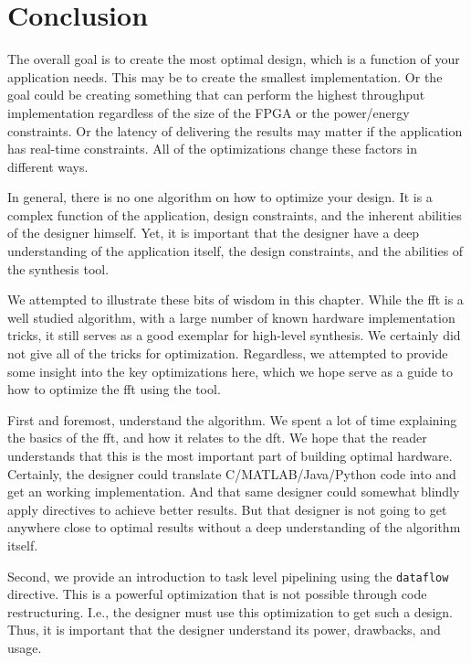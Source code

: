 \section{Conclusion}
\label{sec:fft_conclusion}

The overall goal is to create the most optimal design, which is a function of your application needs. This may be to create the smallest implementation. Or the goal could be creating something that can perform the highest throughput implementation regardless of the size of the FPGA or the power/energy constraints. Or the latency of delivering the results may matter if the application has real-time constraints. All of the optimizations change these factors in different ways. 

In general, there is no one algorithm on how to optimize your design. It is a complex function of the application, design constraints, and the inherent abilities of the designer himself. Yet, it is important that the designer have a deep understanding of the application itself, the design constraints, and the abilities of the synthesis tool. 

We attempted to illustrate these bits of wisdom in this chapter. While the \gls{fft} is a well studied algorithm, with a large number of known hardware implementation tricks, it still serves as a good exemplar for high-level synthesis. We certainly did not give all of the tricks for optimization. %
Regardless, we attempted to provide some insight into the key optimizations here, which we hope serve as a guide to how to optimize the \gls{fft} using the \VHLS tool.

First and foremost, understand the algorithm. We spent a lot of time explaining the basics of the \gls{fft}, and how it relates to the \gls{dft}. We hope that the reader understands that this is the most important part of building optimal hardware. Certainly, the designer could translate C/MATLAB/Java/Python code into \VHLS and get an working implementation. And that same designer could somewhat blindly apply directives to achieve better results. But that designer is not going to get anywhere close to optimal results without a deep understanding of the algorithm itself.

Second, we provide an introduction to  task level pipelining using the \lstinline{dataflow} directive. This is a powerful optimization that is not possible through code restructuring. I.e., the designer must use this optimization to get such a design. Thus, it is important that the designer understand its power, drawbacks, and usage.


